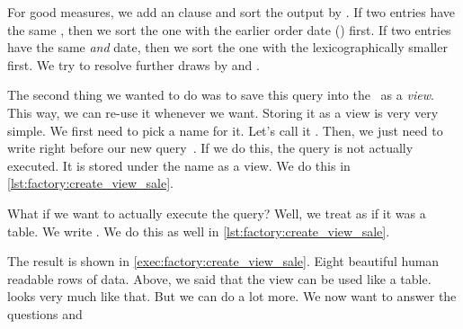 %
For good measures, we add an  clause and sort the output by .
If two entries have the same , then we sort the one with the earlier order date () first.
If two entries have the same  \emph{and}  date, then we sort the one with the lexicographically smaller  first.
We try to resolve further draws by  and .

The second thing we wanted to do was to save this query into the \db\ as a \emph{view}.
This way, we can re-use it whenever we want.
Storing it as a view is very very simple.
We first need to pick a name for it.
Let's call it .
Then, we just need to write  right before our new query~\cite{PGDG:PD:CV}.
If we do this, the query is not actually executed.
It is stored under the name  as a view.
We do this in \cref{lst:factory:create_view_sale}.

What if we want to actually execute the query?
Well, we treat  as if it was a table.
We write .
We do this as well in \cref{lst:factory:create_view_sale}.

The result is shown in \cref{exec:factory:create_view_sale}.
Eight beautiful human readable rows of data.%
%
\FloatBarrier%
\endhsection%
%
%
%
%
%
Above, we said that the view  can be used like a table.
 looks very much like that.
But we can do a lot more.
We now want to answer the questions  and 

